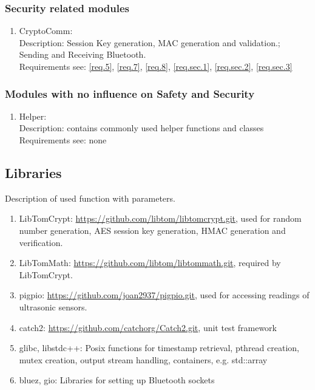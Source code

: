 \subsubsection{Security related modules}

\begin{enumerate}
	\item CryptoComm: \\
		Description: Session Key generation, MAC generation and validation.; Sending and Receiving Bluetooth.\\
		Requirements see: \ref{req.5}, \ref{req.7}, \ref{req.8}, \ref{req.sec.1}, \ref{req.sec.2}, \ref{req.sec.3}\\
\end{enumerate}

\subsubsection{Modules with no influence on Safety and Security}

\begin{enumerate}
	\item Helper: \\
		Description: contains commonly used helper functions and classes \\
		Requirements see: none\\
\end{enumerate}

\subsection{Libraries}

Description of used function with parameters.

\begin{enumerate}
	\item LibTomCrypt: \href{https://github.com/libtom/libtomcrypt.git} {https://github.com/libtom/libtomcrypt.git}, used for random number generation, AES session key generation, HMAC generation and verification.
	\item LibTomMath: \href{https://github.com/libtom/libtommath.git} {https://github.com/libtom/libtommath.git}, required by LibTomCrypt.
	\item pigpio: \href{https://github.com/joan2937/pigpio.git} {https://github.com/joan2937/pigpio.git}, used for accessing readings of ultrasonic sensors.
	\item catch2: \href{https://github.com/catchorg/Catch2.git} {https://github.com/catchorg/Catch2.git}, unit test framework
	\item glibc, libstdc++: Posix functions for timestamp retrieval, pthread creation, mutex creation, output stream handling, containers, e.g. std::array
	\item bluez, gio: Libraries for setting up Bluetooth sockets
\end{enumerate}

